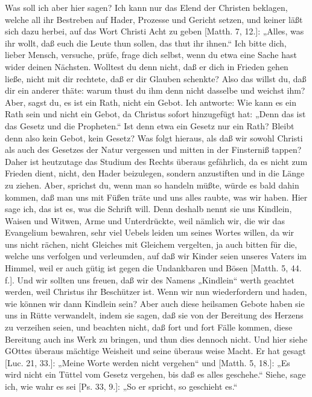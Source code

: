 Was soll ich aber hier sagen? Ich kann nur das Elend der Christen beklagen, welche all ihr Bestreben auf Hader, Prozesse und Gericht setzen, und keiner läßt sich dazu herbei, auf das Wort Christi Acht zu geben [Matth. 7, 12.]: „Alles, was ihr wollt, daß euch die Leute thun sollen, das thut ihr ihnen.“ Ich bitte dich, lieber Mensch, versuche, prüfe, frage dich selbst, wenn du etwa eine Sache hast wider deinen Nächsten. Wolltest du denn nicht, daß er dich in Frieden gehen ließe, nicht mit dir rechtete, daß er dir Glauben schenkte? Also das willst du, daß dir ein anderer thäte: warum thust du ihm denn nicht dasselbe und weichst ihm? Aber, sagst du, es ist ein Rath, nicht ein Gebot. Ich antworte: Wie kann es ein Rath sein und nicht ein Gebot, da Christus sofort hinzugefügt hat: „Denn das ist das Gesetz und die Propheten.“ Ist denn etwa ein Gesetz nur ein Rath? Bleibt denn also kein Gebot, kein Gesetz? Was folgt hieraus, als daß wir sowohl Christi als auch des Gesetzes der Natur vergessen und mitten in der Finsterniß tappen? Daher ist heutzutage das Studium des Rechts überaus gefährlich, da es nicht zum Frieden dient, nicht, den Hader beizulegen, sondern anzustiften und in die Länge zu ziehen. Aber, sprichst du, wenn man so handeln müßte, würde es bald dahin kommen, daß man uns mit Füßen träte und uns alles raubte, was wir haben. Hier sage ich, das ist es, was die
Schrift will. Denn deshalb nennt sie uns Kindlein, Waisen und Witwen, Arme und Unterdrückte, weil nämlich wir, die wir das Evangelium bewahren, sehr viel Uebels leiden um seines Wortes willen, da wir uns nicht rächen, nicht Gleiches mit Gleichem vergelten, ja auch bitten für die, welche uns verfolgen und verleumden, auf daß wir Kinder seien unseres Vaters im Himmel, weil er auch gütig ist gegen die Undankbaren und Bösen [Matth. 5, 44. f.]. Und wir sollten uns freuen, daß wir des Namens „Kindlein“ werth geachtet werden, weil Christus ihr Beschützer ist. Wenn wir nun wiederfordern und haden, wie können wir dann Kindlein sein? Aber auch diese heilsamen Gebote haben sie uns in Rütte verwandelt, indem sie sagen, daß sie von der Bereitung des Herzens zu verzeihen seien, und beachten nicht, daß fort und fort Fälle kommen, diese Bereitung auch ins Werk zu bringen, und thun dies dennoch nicht. Und hier siehe GOttes überaus mächtige Weisheit und seine überaus weise Macht. Er hat gesagt [Luc. 21, 33.]: „Meine Worte werden nicht vergehen“ und [Matth. 5, 18.]: „Es wird nicht ein Tüttel vom Gesetz vergehen, bis daß es alles geschehe.“ Siehe, sage ich, wie wahr es sei [Ps. 33, 9.]: „So er spricht, so geschieht es.“

